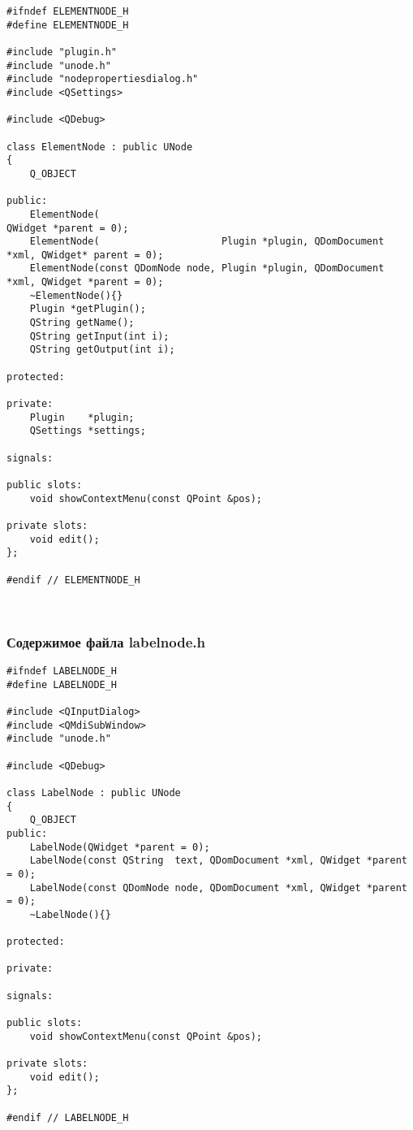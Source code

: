 \begin{lstlisting}
#ifndef ELEMENTNODE_H
#define ELEMENTNODE_H

#include "plugin.h"
#include "unode.h"
#include "nodepropertiesdialog.h"
#include <QSettings>

#include <QDebug>

class ElementNode : public UNode
{
    Q_OBJECT

public:
    ElementNode(                                                        QWidget *parent = 0);
    ElementNode(                     Plugin *plugin, QDomDocument *xml, QWidget* parent = 0);
    ElementNode(const QDomNode node, Plugin *plugin, QDomDocument *xml, QWidget *parent = 0);
    ~ElementNode(){}
    Plugin *getPlugin();
    QString getName();
    QString getInput(int i);
    QString getOutput(int i);

protected:

private:
    Plugin    *plugin;
    QSettings *settings;

signals:

public slots:
    void showContextMenu(const QPoint &pos);

private slots:
    void edit();
};

#endif // ELEMENTNODE_H
\end{lstlisting}~\\

\subsubsection*{Содержимое файла labelnode.h}

\begin{lstlisting}
#ifndef LABELNODE_H
#define LABELNODE_H

#include <QInputDialog>
#include <QMdiSubWindow>
#include "unode.h"

#include <QDebug>

class LabelNode : public UNode
{
    Q_OBJECT
public:
    LabelNode(QWidget *parent = 0);
    LabelNode(const QString  text, QDomDocument *xml, QWidget *parent = 0);
    LabelNode(const QDomNode node, QDomDocument *xml, QWidget *parent = 0);
    ~LabelNode(){}

protected:

private:

signals:

public slots:
    void showContextMenu(const QPoint &pos);

private slots:
    void edit();
};

#endif // LABELNODE_H
\end{lstlisting}~\\

